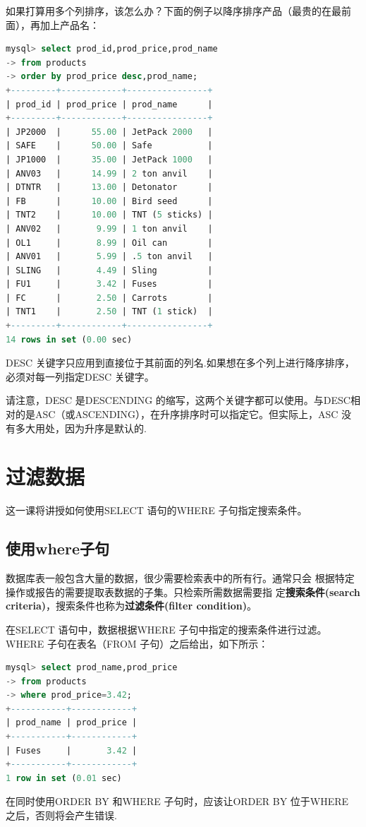 \documentclass[11pt,a4paper,oneside]{book}
\begin{document}
如果打算用多个列排序，该怎么办？下面的例子以降序排序产品（最贵的在最前面），再加上产品名：
\begin{lstlisting}[language=sql]
mysql> select prod_id,prod_price,prod_name
-> from products
-> order by prod_price desc,prod_name;
+---------+------------+----------------+
| prod_id | prod_price | prod_name      |
+---------+------------+----------------+
| JP2000  |      55.00 | JetPack 2000   |
| SAFE    |      50.00 | Safe           |
| JP1000  |      35.00 | JetPack 1000   |
| ANV03   |      14.99 | 2 ton anvil    |
| DTNTR   |      13.00 | Detonator      |
| FB      |      10.00 | Bird seed      |
| TNT2    |      10.00 | TNT (5 sticks) |
| ANV02   |       9.99 | 1 ton anvil    |
| OL1     |       8.99 | Oil can        |
| ANV01   |       5.99 | .5 ton anvil   |
| SLING   |       4.49 | Sling          |
| FU1     |       3.42 | Fuses          |
| FC      |       2.50 | Carrots        |
| TNT1    |       2.50 | TNT (1 stick)  |
+---------+------------+----------------+
14 rows in set (0.00 sec)
\end{lstlisting}
DESC 关键字只应用到直接位于其前面的列名.如果想在多个列上进行降序排序，必须对每一列指定DESC 关键字。

请注意，DESC 是DESCENDING 的缩写，这两个关键字都可以使用。与DESC相对的是ASC（或ASCENDING），在升序排序时可以指定它。但实际上，ASC 没有多大用处，因为升序是默认的.

\chapter{过滤数据}
这一课将讲授如何使用SELECT 语句的WHERE 子句指定搜索条件。
\section{使用where子句}
数据库表一般包含大量的数据，很少需要检索表中的所有行。通常只会
根据特定操作或报告的需要提取表数据的子集。只检索所需数据需要指
定\textbf{搜索条件(search criteria)}，搜索条件也称为\textbf{过滤条件(filter condition)}。

在SELECT 语句中，数据根据WHERE 子句中指定的搜索条件进行过滤。WHERE 子句在表名（FROM 子句）之后给出，如下所示：
\begin{lstlisting}[language=sql]
mysql> select prod_name,prod_price
-> from products
-> where prod_price=3.42;
+-----------+------------+
| prod_name | prod_price |
+-----------+------------+
| Fuses     |       3.42 |
+-----------+------------+
1 row in set (0.01 sec)
\end{lstlisting}
在同时使用ORDER BY 和WHERE 子句时，应该让ORDER BY 位于WHERE 之后，否则将会产生错误.
\end{document}

